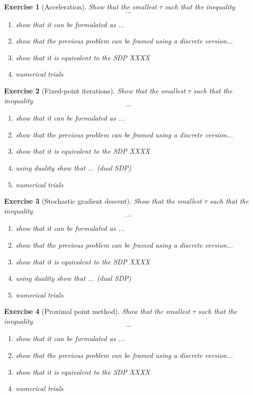 \documentclass[11pt,a4paper]{article}
\newtheorem{exercise}{Exercise}
\begin{document}
	
	\begin{exercise}[Acceleration]
	Show that the smallest $\tau$ such that the inequality
	\[ ... \]
	\begin{enumerate}
	\item show that it can be formulated as ...
	\item show that the previous problem can be framed using a discrete version...
	\item show that it is equivalent to the SDP XXXX
	\item numerical trials
	\end{enumerate}
	\end{exercise}
	
	\begin{exercise}[Fixed-point iterations]
	Show that the smallest $\tau$ such that the inequality
	\[ ... \]
	\begin{enumerate}
	\item show that it can be formulated as ...
	\item show that the previous problem can be framed using a discrete version...
	\item show that it is equivalent to the SDP XXXX
	\item using duality show that ... (dual SDP)
	\item numerical trials
	\end{enumerate}
	\end{exercise}
	
	
	\begin{exercise}[Stochastic gradient descent]
	Show that the smallest $\tau$ such that the inequality
	\[ ... \]
	\begin{enumerate}
	\item show that it can be formulated as ...
	\item show that the previous problem can be framed using a discrete version...
	\item show that it is equivalent to the SDP XXXX
	\item using duality show that ... (dual SDP)
	\item numerical trials
	\end{enumerate}
	\end{exercise}
	
	
	\begin{exercise}[Proximal point method]
	Show that the smallest $\tau$ such that the inequality
	\[ ... \]
	\begin{enumerate}
	\item show that it can be formulated as ...
	\item show that the previous problem can be framed using a discrete version...
	\item show that it is equivalent to the SDP XXXX
	\item numerical trials
	\end{enumerate}
	\end{exercise}
	
\end{document}
